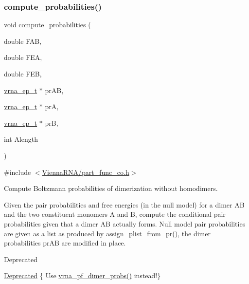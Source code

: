 \subsubsection{\texorpdfstring{compute\+\_\+probabilities()}{compute\_probabilities()}}
{\footnotesize\ttfamily void compute\+\_\+probabilities (\begin{DoxyParamCaption}\item[{double}]{F\+AB,  }\item[{double}]{F\+EA,  }\item[{double}]{F\+EB,  }\item[{\hyperlink{group__struct__utils__plist_gab9ac98ab55ded9fb90043b024b915aca}{vrna\+\_\+ep\+\_\+t} $\ast$}]{pr\+AB,  }\item[{\hyperlink{group__struct__utils__plist_gab9ac98ab55ded9fb90043b024b915aca}{vrna\+\_\+ep\+\_\+t} $\ast$}]{prA,  }\item[{\hyperlink{group__struct__utils__plist_gab9ac98ab55ded9fb90043b024b915aca}{vrna\+\_\+ep\+\_\+t} $\ast$}]{prB,  }\item[{int}]{Alength }\end{DoxyParamCaption})}



{\ttfamily \#include $<$\hyperlink{part__func__co_8h}{Vienna\+R\+N\+A/part\+\_\+func\+\_\+co.\+h}$>$}



Compute Boltzmann probabilities of dimerization without homodimers. 

Given the pair probabilities and free energies (in the null model) for a dimer AB and the two constituent monomers A and B, compute the conditional pair probabilities given that a dimer AB actually forms. Null model pair probabilities are given as a list as produced by \hyperlink{group__part__func__global__deprecated_ga1cc05aaa9b0e7df2d3887e98321c2030}{assign\+\_\+plist\+\_\+from\+\_\+pr()}, the dimer probabilities \textquotesingle{}pr\+AB\textquotesingle{} are modified in place.

\begin{DoxyRefDesc}{Deprecated}
\item[\hyperlink{deprecated__deprecated000113}{Deprecated}]\{ Use \hyperlink{group__part__func__global_gaa1e39e73afb51fbaf4ae38f0c066c46b}{vrna\+\_\+pf\+\_\+dimer\+\_\+probs()} instead!\}\end{DoxyRefDesc}



